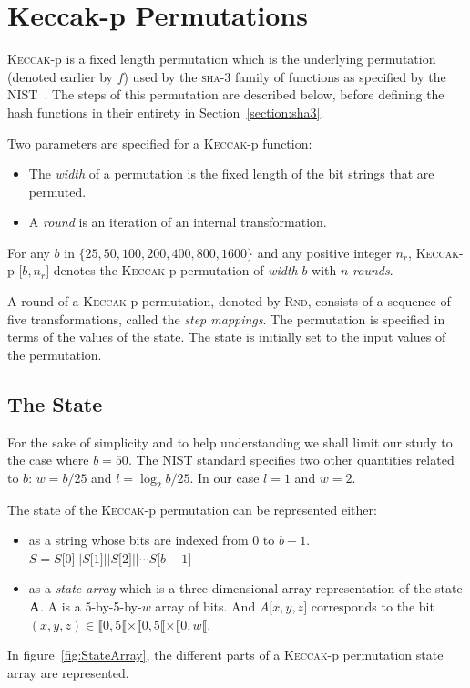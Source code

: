 \section{Keccak-p Permutations}
\textsc{Keccak}-p is a fixed length permutation which is the underlying permutation (denoted earlier by $f$) used by the \textsc{sha-3} family of functions as specified by the NIST~\cite{NIST}. The steps of this permutation are described below, before defining the hash functions in their entirety in Section~\ref{section:sha3}.

\begin{defn} Two parameters are specified for a \textsc{Keccak}-p function:
  \begin{itemize}[label=\textperiodcentered,nolistsep]
  \item The \emph{width} of a permutation is the fixed length of the bit strings that are permuted.
    \item A \emph{round} is an iteration of an internal transformation.
  \end{itemize}
\end{defn}

For any $b$ in $ \{25, 50, 100, 200, 400, 800, 1600\} $ and any positive integer $n_r$, \textsc{Keccak}-p $\lbrack b, n_r \rbrack$ denotes the \textsc{Keccak}-p permutation of \emph{width} $b$ with $n$ \emph{rounds}.

A round of a \textsc{Keccak}-p permutation, denoted by \textsc{Rnd}, consists of a sequence of five transformations, called the \emph{step mappings}. The permutation is specified in terms of the values of the state. The state is initially set to the
input values of the permutation.
\subsection{The State}
For the sake of simplicity and to help understanding we shall limit our study to the case where $b=50$.
The NIST standard specifies two other quantities related to $b$: $w=b/25$ and $l = \log_2{b/25}$. In our case $l = 1$ and $w=2$.

The state of the \textsc{Keccak}-p permutation can be represented either:
\begin{itemize}
\item as a string whose bits are indexed from 0 to $b-1$. $S=S\lbrack 0 \rbrack \vert \vert S\lbrack 1 \rbrack \vert \vert S\lbrack 2 \rbrack \vert \vert \cdots S\lbrack b-1 \rbrack$
\item as a \emph{state array} which is a three dimensional array representation of the state \textbf{A}. A is a 5-by-5-by-$w$ array of bits. And $A\lbrack x,y,z \rbrack$ corresponds to the bit $(x,y,z) \in \llbracket 0,5 \llbracket \times \llbracket 0,5 \llbracket \times \llbracket 0,w \llbracket$.
\end{itemize}
In figure~\ref{fig:StateArray}, the different parts of a \textsc{Keccak}-p permutation state array are represented.

